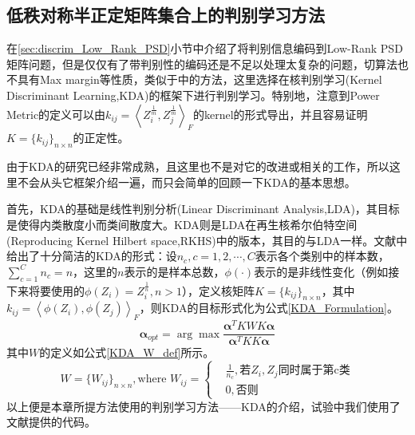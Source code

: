 \subsection{低秩对称半正定矩阵集合上的判别学习方法}
在\ref{sec:discrim_Low_Rank_PSD}小节中介绍了将判别信息编码到Low-Rank PSD矩阵问题，但是仅仅有了带判别性的编码还是不足以处理太复杂的问题，切算法也不具有Max margin等性质，类似于\cite{PSD_WACV}中的方法，这里选择在核判别学习(Kernel Discriminant Learning,KDA)\cite{Kernel_KDA}的框架下进行判别学习。特别地，注意到Power Metric的定义可以由$k_{ij}=\left<Z_{i}^{\frac{1}{m}},Z_{j}^{\frac{1}{m}}\right>_{F}$的kernel的形式导出，并且容易证明$K=\{k_{ij}\}_{n\times  n}$的正定性。

由于KDA\cite{Kernel_KDA}的研究已经非常成熟，且这里也不是对它的改进或相关的工作，所以这里不会从头它框架介绍一遍，而只会简单的回顾一下KDA的基本思想。

首先，KDA的基础是线性判别分析(Linear Discriminant Analysis,LDA)，其目标是使得内类散度小而类间散度大。KDA则是LDA在再生核希尔伯特空间(Reproducing Kernel Hilbert space,RKHS)中的版本，其目的与LDA一样。文献\cite{Kernel_KDA}中给出了十分简洁的KDA的形式：设$n_c,c=1,2,\cdots,C$表示各个类别中的样本数，$\sum_{c=1}^{C}n_{c}=n$，这里的$n$表示的是样本总数，$\phi(\cdot)$表示的是非线性变化（例如接下来将要使用的$\phi(Z_{i})=Z_{i}^{\frac{1}{n}},n>1$），定义核矩阵$K=\{k_{ij}\}_{n\times n}$，其中$k_{ij}=\left<\phi(Z_{i}),\phi(Z_j)\right>_{F}$，则KDA的目标形式化为公式\ref{KDA_Formulation}。
\begin{equation}
\label{KDA_Formulation}
\bm{\alpha}_{opt}=\arg \max\frac{\bm{\alpha}^{T}KWK\bm{\alpha}}{\bm{\alpha}^{T}KK\bm{\alpha}}
\end{equation}
其中$W$的定义如公式\ref{KDA_W_def}所示。
\begin{equation}
\label{KDA_W_def}
W=\{W_{ij}\}_{n \times n},\text{where }W_{ij}=\left\{
\begin{split}
&\frac{1}{n_{c}},\text{若$Z_{i},Z_{j}$同时属于第c类}\\
&0, \text{否则}
\end{split}
\right.
\end{equation}
以上便是本章所提方法使用的判别学习方法——KDA\cite{Kernel_KDA}的介绍，试验中我们使用了文献\cite{KDA_DengCai1,KDA_DengCai2}提供的代码。
